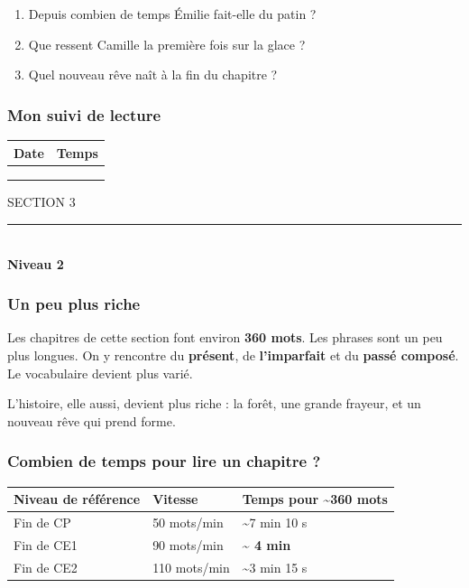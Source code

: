 \documentclass[
  french,
  french,
  14pt,
  a4paper]{extarticle}
\newcounter{none} %
\providecommand{\tightlist}{%
  \setlength{\itemsep}{0pt}\setlength{\parskip}{0pt}}
\newcommand{\sectiondivider}[2]{%
  \vspace*{2cm}%
  \begin{center}
    {\fontsize{18pt}{22pt}\selectfont\textcolor{accentcolor}{\MakeUppercase{Section #1}}}\\[0.6em]
    \textcolor{accentcolor}{\rule{0.35\textwidth}{1.5pt}}\\[1em]
    {\fontsize{38pt}{44pt}\selectfont\bfseries #2}
  \end{center}
  \vspace{1.5cm}
}
\begin{document}
{\begin{enumerate}
\def\labelenumi{\arabic{enumi}.}
\tightlist
\item
  Depuis combien de temps Émilie fait-elle du patin ?
\item
  Que ressent Camille la première fois sur la glace ?
\item
  Quel nouveau rêve naît à la fin du chapitre ?
\end{enumerate}

\subsubsection{Mon suivi de lecture}\label{mon-suivi-de-lecture-7}

\begin{center}
\begin{tabularx}{\textwidth}{|X|X|}
\hline
\textbf{Date} & \textbf{Temps} \\
\hline
& \\
\hline
& \\
\hline
& \\
\hline
\end{tabularx}
\end{center}

}%
\newpage

\sectiondivider{3}{Niveau 2}

\subsubsection{Un peu plus riche}\label{un-peu-plus-riche}

Les chapitres de cette section font environ \textbf{360 mots}. Les
phrases sont un peu plus longues. On y rencontre du \textbf{présent}, de
\textbf{l'imparfait} et du \textbf{passé composé}. Le vocabulaire
devient plus varié.

L'histoire, elle aussi, devient plus riche : la forêt, une grande
frayeur, et un nouveau rêve qui prend forme.

\subsubsection{Combien de temps pour lire un chapitre
?}\label{combien-de-temps-pour-lire-un-chapitre-2}

{\def\LTcaptype{none} %
\begin{longtable}[]{@{}lll@{}}
\toprule\noalign{}
Niveau de référence & Vitesse & Temps pour \textasciitilde360 mots \\
\midrule\noalign{}
\endhead
\bottomrule\noalign{}
\endlastfoot
Fin de CP & 50 mots/min & \textasciitilde7 min 10 s \\
Fin de CE1 & 90 mots/min & \textbf{\textasciitilde{} 4 min} \\
Fin de CE2 & 110 mots/min & \textasciitilde3 min 15 s \\
\end{longtable}
}
\end{document}
